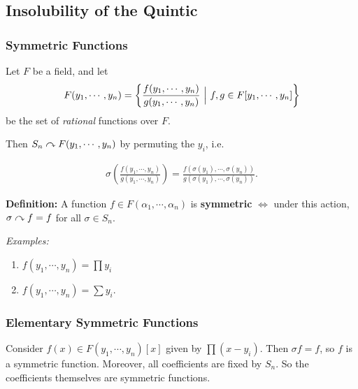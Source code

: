 \hypertarget{insolubility-of-the-quintic}{%
\subsection{Insolubility of the
Quintic}\label{insolubility-of-the-quintic}}

\hypertarget{symmetric-functions}{%
\subsubsection{Symmetric Functions}\label{symmetric-functions}}

Let \(F\) be a field, and let
\begin{align*}
F(y_1, \cdots , y_n) = \left\{{\frac{f(y_1, \cdots, y_n)}{g(y_1, \cdots, y_n)} {~\mathrel{\Big|}~} f, g \in F[y_1, \cdots, y_n]}\right\}
\end{align*} be the set of \emph{rational} functions over \(F\).

Then \(S_n \curvearrowright F(y_1, \cdots, y_n)\) by permuting the \(y_i\), i.e.

\begin{align*}
\sigma \left(\frac{
f(y_1, \cdots, y_n)
}{
g(y_1, \cdots, y_n)
}\right) = \frac{
f(\sigma(y_1), \cdots, \sigma(y_n))
}{
g(\sigma(y_1), \cdots, \sigma(y_n))
}
.\end{align*}

\textbf{Definition:} A function \(f \in F(\alpha_1, \cdots, \alpha_n)\)
is \textbf{symmetric} \(\iff\) under this action,
\(\sigma\curvearrowright f = f\) for all \(\sigma \in S_n\).

\emph{Examples:}

\begin{enumerate}
\def\labelenumi{\arabic{enumi}.}
\tightlist
\item
  \(f(y_1, \cdots, y_n) = \prod y_i\)
\item
  \(f(y_1, \cdots, y_n) = \sum y_i\).
\end{enumerate}

\hypertarget{elementary-symmetric-functions}{%
\subsubsection{Elementary Symmetric
Functions}\label{elementary-symmetric-functions}}

Consider \(f(x) \in F(y_1, \cdots, y_n)[x]\) given by \(\prod (x-y_i)\).
Then \(\sigma f = f\), so \(f\) is a symmetric function. Moreover, all
coefficients are fixed by \(S_n\). So the coefficients themselves are
symmetric functions.

